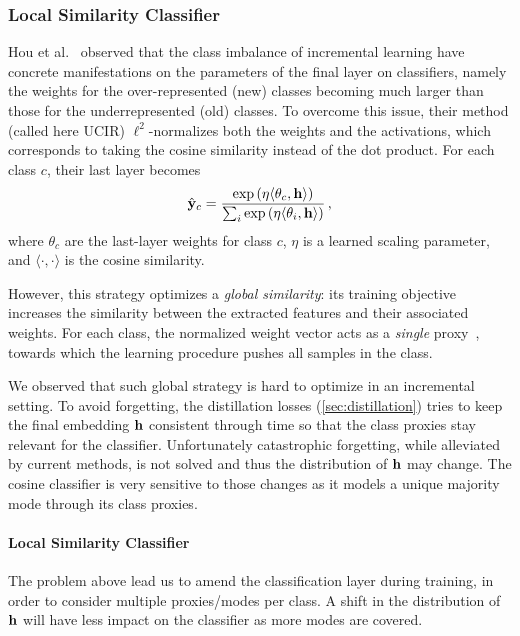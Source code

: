 \subsubsection{Local Similarity Classifier}
\label{sec:local_classifier}

Hou et al.~\citep{hou2019ucir} observed that the class imbalance of incremental learning have
concrete manifestations on the parameters of the final layer on classifiers, namely the weights for
the over-represented (new) classes becoming much larger than those for the underrepresented (old)
classes. To overcome this issue, their method (called here UCIR) $\ell^2$-normalizes both the
weights and the activations, which corresponds to taking the cosine similarity instead of the dot
product. For each class $c$, their last layer becomes
%
\begin{equation}
    \hat{\mathbf{y}}_{c}=\frac{\exp\left(\eta\langle\theta_{c},\mathbf{h}\rangle\right)}{\sum_{i} \exp \left(\eta\langle\theta_{i}, \mathbf{h}\rangle\right)}\,,
\end{equation}
%
where $\theta_c$ are the last-layer weights for class $c$, $\eta$ is a learned scaling parameter,
and $\langle\cdot,\cdot\rangle$ is the cosine similarity.

However, this strategy optimizes a \textit{global similarity}: its training objective increases the
similarity between the extracted features and their associated weights. For each class, the
normalized weight vector acts as a \textit{single} proxy~\citep{attias2017proxynca}, towards which
the learning procedure pushes all samples in the class.

We observed that such global strategy is hard to optimize in an incremental setting. To avoid
forgetting, the distillation losses (\autoref{sec:distillation}) tries to keep the final embedding
$\mathbf{h}$ consistent through time so that the class proxies stay relevant for the classifier.
Unfortunately catastrophic forgetting, while alleviated by current methods, is not solved and thus
the distribution of $\mathbf{h}$ may change. The cosine classifier is very sensitive to those changes as it
models a unique majority mode through its class proxies.


\paragraph{Local Similarity Classifier} The problem above lead us to amend the classification layer
during training, in order to consider multiple proxies/modes per class. A shift in the distribution
of $\mathbf{h}$ will have less impact on the classifier as more modes are covered.


